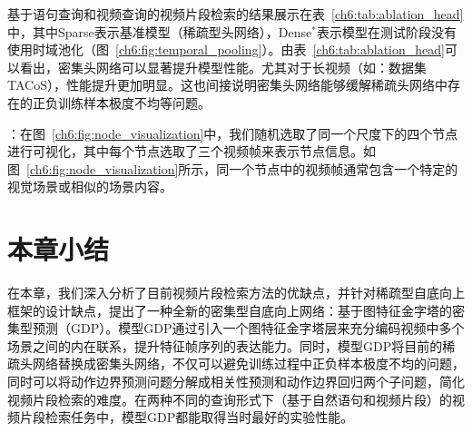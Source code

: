 基于语句查询和视频查询的视频片段检索的结果展示在表~\ref{ch6:tab:ablation_head}中，其中Sparse表示基准模型（稀疏型头网络），Dense$^*$表示模型在测试阶段没有使用时域池化（图~\ref{ch6:fig:temporal_pooling}）。由表~\ref{ch6:tab:ablation_head}可以看出，密集头网络可以显著提升模型性能。尤其对于长视频（如：数据集TACoS），性能提升更加明显。这也间接说明密集头网络能够缓解稀疏头网络中存在的正负训练样本极度不均等问题。


\textbf{}：在图~\ref{ch6:fig:node_visualization}中，我们随机选取了同一个尺度下的四个节点进行可视化，其中每个节点选取了三个视频帧来表示节点信息。如图~\ref{ch6:fig:node_visualization}所示，同一个节点中的视频帧通常包含一个特定的视觉场景或相似的场景内容。

\section{本章小结}
在本章，我们深入分析了目前视频片段检索方法的优缺点，并针对稀疏型自底向上框架的设计缺点，提出了一种全新的密集型自底向上网络：基于图特征金字塔的密集型预测（GDP）。模型GDP通过引入一个图特征金字塔层来充分编码视频中多个场景之间的内在联系，提升特征帧序列的表达能力。同时，模型GDP将目前的稀疏头网络替换成密集头网络，不仅可以避免训练过程中正负样本极度不均的问题，同时可以将动作边界预测问题分解成相关性预测和动作边界回归两个子问题，简化视频片段检索的难度。在两种不同的查询形式下（基于自然语句和视频片段）的视频片段检索任务中，模型GDP都能取得当时最好的实验性能。
